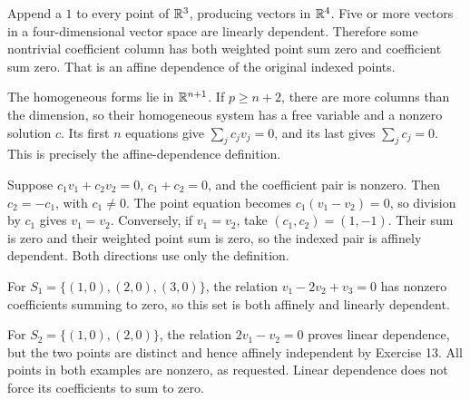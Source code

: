 Append a $1$ to every point of $\mathbb{R}^3$, producing vectors in $\mathbb{R}^4$. Five or more vectors in a four-dimensional vector space are linearly dependent. Therefore some nontrivial coefficient column has both weighted point sum zero and coefficient sum zero. That is an affine dependence of the original indexed points.

The homogeneous forms lie in $\mathbb{R}^{n+1}$. If $p\ge n+2$, there are more columns than the dimension, so their homogeneous system has a free variable and a nonzero solution $c$. Its first $n$ equations give $\sum_jc_jv_j=0$, and its last gives $\sum_jc_j=0$. This is precisely the affine-dependence definition.

Suppose $c_1v_1+c_2v_2=0$, $c_1+c_2=0$, and the coefficient pair is nonzero. Then $c_2=-c_1$, with $c_1\ne0$. The point equation becomes $c_1(v_1-v_2)=0$, so division by $c_1$ gives $v_1=v_2$. Conversely, if $v_1=v_2$, take $(c_1,c_2)=(1,-1)$. Their sum is zero and their weighted point sum is zero, so the indexed pair is affinely dependent. Both directions use only the definition.

For $S_1=\{(1,0),(2,0),(3,0)\}$, the relation $v_1-2v_2+v_3=0$ has nonzero coefficients summing to zero, so this set is both affinely and linearly dependent.

For $S_2=\{(1,0),(2,0)\}$, the relation $2v_1-v_2=0$ proves linear dependence, but the two points are distinct and hence affinely independent by Exercise 13. All points in both examples are nonzero, as requested. Linear dependence does not force its coefficients to sum to zero.

